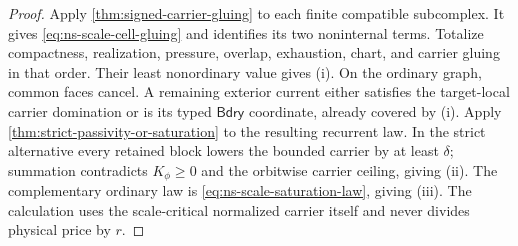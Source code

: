 \documentclass[11pt]{article}
\numberwithin{section}{part}
\theoremstyle{plain}
\theoremstyle{definition}
\theoremstyle{remark}
\newcommand{\Bdry}{\mathsf{Bdry}}
\begin{document}
\begin{proof}
Apply \cref{thm:signed-carrier-gluing} to each finite compatible subcomplex.
It gives \eqref{eq:ns-scale-cell-gluing} and identifies its two noninternal
terms.  Totalize compactness, realization, pressure, overlap, exhaustion,
chart, and carrier gluing in that order.  Their least nonordinary value gives
\textup{(i)}.  On the ordinary graph, common faces cancel.  A remaining
  exterior current either satisfies the target-local carrier domination or is
  its typed \(\Bdry\) coordinate, already covered by \textup{(i)}.  Apply
\cref{thm:strict-passivity-or-saturation} to the resulting recurrent law.
In the strict alternative every retained block lowers the bounded carrier by
at least \(\delta\); summation contradicts \(K_\phi\ge0\) and the orbitwise
carrier ceiling, giving \textup{(ii)}.  The complementary ordinary law is
\eqref{eq:ns-scale-saturation-law}, giving \textup{(iii)}.  The calculation
uses the scale-critical normalized carrier itself and never divides physical
price by \(r\).
\end{proof}
\end{document}
